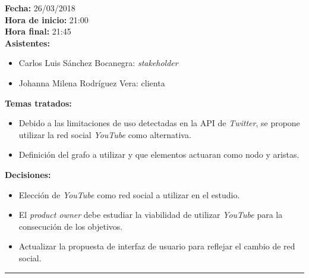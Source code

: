 \documentclass[11pt,a4paper]{article}
\begin{document}
\noindent\textbf{Fecha:} 26/03/2018
\\
\noindent\textbf{Hora de inicio:} 21:00
\\
\noindent\textbf{Hora final:} 21:45
\\
\noindent\textbf{Asistentes:} 
\begin{itemize}
\item Carlos Luis Sánchez Bocanegra: \textit{stakeholder}
\item Johanna Milena Rodríguez Vera: clienta
\end{itemize}
\noindent\textbf{Temas tratados:}
\begin{itemize}
\item Debido a las limitaciones de uso detectadas en la API de \textit{Twitter}, se propone utilizar la red social \textit{YouTube} como alternativa.
\item Definición del grafo a utilizar y que elementos actuaran como nodo y aristas.  
\end{itemize}
\noindent\textbf{Decisiones:}
\begin{itemize}
\item Elección de \textit{YouTube} como red social a utilizar en el estudio.
\item El \textit{product owner} debe estudiar la viabilidad de utilizar \textit{YouTube} para la consecución de los objetivos. 
\item Actualizar la propuesta de interfaz de usuario para reflejar el cambio de red social.
\end{itemize}

\begin{center}\rule{10cm}{0.4pt}\end{center}
\end{document}
